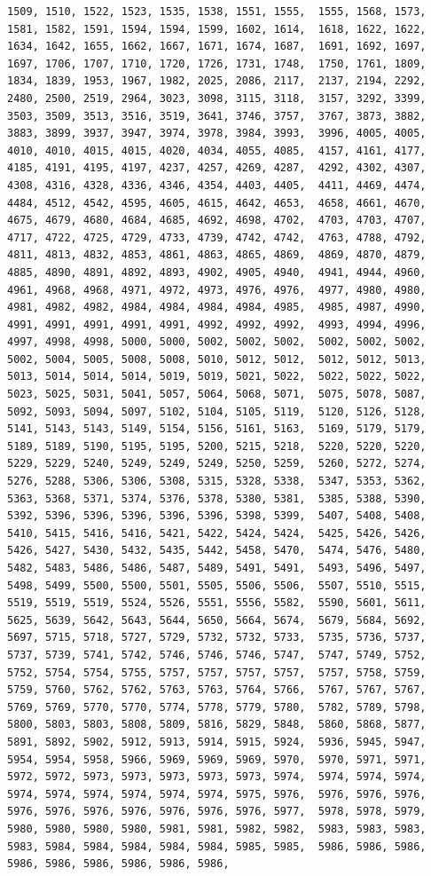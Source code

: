 \documentclass[
]{article}
\begin{document}
\begin{verbatim}
1509, 1510, 1522, 1523, 1535, 1538, 1551, 1555,  1555, 1568, 1573, 1581, 1582, 1591, 1594, 1594, 1599, 1602, 1614,  1618, 1622, 1622, 1634, 1642, 1655, 1662, 1667, 1671, 1674, 1687,  1691, 1692, 1697, 1697, 1706, 1707, 1710, 1720, 1726, 1731, 1748,  1750, 1761, 1809, 1834, 1839, 1953, 1967, 1982, 2025, 2086, 2117,  2137, 2194, 2292, 2480, 2500, 2519, 2964, 3023, 3098, 3115, 3118,  3157, 3292, 3399, 3503, 3509, 3513, 3516, 3519, 3641, 3746, 3757,  3767, 3873, 3882, 3883, 3899, 3937, 3947, 3974, 3978, 3984, 3993,  3996, 4005, 4005, 4010, 4010, 4015, 4015, 4020, 4034, 4055, 4085,  4157, 4161, 4177, 4185, 4191, 4195, 4197, 4237, 4257, 4269, 4287,  4292, 4302, 4307, 4308, 4316, 4328, 4336, 4346, 4354, 4403, 4405,  4411, 4469, 4474, 4484, 4512, 4542, 4595, 4605, 4615, 4642, 4653,  4658, 4661, 4670, 4675, 4679, 4680, 4684, 4685, 4692, 4698, 4702,  4703, 4703, 4707, 4717, 4722, 4725, 4729, 4733, 4739, 4742, 4742,  4763, 4788, 4792, 4811, 4813, 4832, 4853, 4861, 4863, 4865, 4869,  4869, 4870, 4879, 4885, 4890, 4891, 4892, 4893, 4902, 4905, 4940,  4941, 4944, 4960, 4961, 4968, 4968, 4971, 4972, 4973, 4976, 4976,  4977, 4980, 4980, 4981, 4982, 4982, 4984, 4984, 4984, 4984, 4985,  4985, 4987, 4990, 4991, 4991, 4991, 4991, 4991, 4992, 4992, 4992,  4993, 4994, 4996, 4997, 4998, 4998, 5000, 5000, 5002, 5002, 5002,  5002, 5002, 5002, 5002, 5004, 5005, 5008, 5008, 5010, 5012, 5012,  5012, 5012, 5013, 5013, 5014, 5014, 5014, 5019, 5019, 5021, 5022,  5022, 5022, 5022, 5023, 5025, 5031, 5041, 5057, 5064, 5068, 5071,  5075, 5078, 5087, 5092, 5093, 5094, 5097, 5102, 5104, 5105, 5119,  5120, 5126, 5128, 5141, 5143, 5143, 5149, 5154, 5156, 5161, 5163,  5169, 5179, 5179, 5189, 5189, 5190, 5195, 5195, 5200, 5215, 5218,  5220, 5220, 5220, 5229, 5229, 5240, 5249, 5249, 5249, 5250, 5259,  5260, 5272, 5274, 5276, 5288, 5306, 5306, 5308, 5315, 5328, 5338,  5347, 5353, 5362, 5363, 5368, 5371, 5374, 5376, 5378, 5380, 5381,  5385, 5388, 5390, 5392, 5396, 5396, 5396, 5396, 5396, 5398, 5399,  5407, 5408, 5408, 5410, 5415, 5416, 5416, 5421, 5422, 5424, 5424,  5425, 5426, 5426, 5426, 5427, 5430, 5432, 5435, 5442, 5458, 5470,  5474, 5476, 5480, 5482, 5483, 5486, 5486, 5487, 5489, 5491, 5491,  5493, 5496, 5497, 5498, 5499, 5500, 5500, 5501, 5505, 5506, 5506,  5507, 5510, 5515, 5519, 5519, 5519, 5524, 5526, 5551, 5556, 5582,  5590, 5601, 5611, 5625, 5639, 5642, 5643, 5644, 5650, 5664, 5674,  5679, 5684, 5692, 5697, 5715, 5718, 5727, 5729, 5732, 5732, 5733,  5735, 5736, 5737, 5737, 5739, 5741, 5742, 5746, 5746, 5746, 5747,  5747, 5749, 5752, 5752, 5754, 5754, 5755, 5757, 5757, 5757, 5757,  5757, 5758, 5759, 5759, 5760, 5762, 5762, 5763, 5763, 5764, 5766,  5767, 5767, 5767, 5769, 5769, 5770, 5770, 5774, 5778, 5779, 5780,  5782, 5789, 5798, 5800, 5803, 5803, 5808, 5809, 5816, 5829, 5848,  5860, 5868, 5877, 5891, 5892, 5902, 5912, 5913, 5914, 5915, 5924,  5936, 5945, 5947, 5954, 5954, 5958, 5966, 5969, 5969, 5969, 5970,  5970, 5971, 5971, 5972, 5972, 5973, 5973, 5973, 5973, 5973, 5974,  5974, 5974, 5974, 5974, 5974, 5974, 5974, 5974, 5974, 5975, 5976,  5976, 5976, 5976, 5976, 5976, 5976, 5976, 5976, 5976, 5976, 5977,  5978, 5978, 5979, 5980, 5980, 5980, 5980, 5981, 5981, 5982, 5982,  5983, 5983, 5983, 5983, 5984, 5984, 5984, 5984, 5984, 5985, 5985,  5986, 5986, 5986, 5986, 5986, 5986, 5986, 5986, 5986, 
\end{verbatim}
\end{document}
